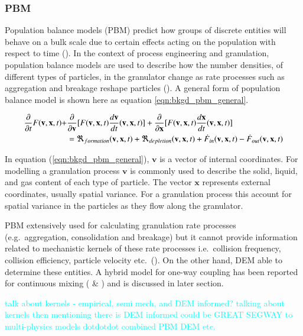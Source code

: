 \documentclass[preprint,11pt,authoryear]{elsarticle}
\begin{document}
	    \subsubsection{PBM}
	    \par Population balance models (PBM) predict how groups of discrete entities will behave on a bulk scale due to certain effects acting on the population with respect to time (\cite{ramkrishna2014}). In the context of process engineering and granulation, population balance models are used to describe how the number densities, of different types of particles, in the granulator change as rate processes such as aggregation and breakage reshape particles (\cite{Barrasso2013}). A general form of population balance model is shown here as equation \ref{eqn:bkgd_pbm_general}.
	    
	    \begin{align}
	    \frac{ \partial}{\partial t}F(\textbf{v},\textbf{x},t) +& \frac{\partial}{\partial \textbf{v}}[F(\textbf{v},\textbf{x},t)\frac{d\textbf{v}}{dt}(\textbf{v},\textbf{x},t)] + \frac{\partial}{\partial \textbf{x}}[F(\textbf{v},\textbf{x},t)\frac{d\textbf{x}}{dt}(\textbf{v},\textbf{x},t)] \notag\\
	    &= \Re_{formation}(\textbf{v},\textbf{x},t)+\Re_{depletion}(\textbf{v},\textbf{x},t)+\dot{F}_{in}(\textbf{v},\textbf{x},t)-\dot{F}_{out}(\textbf{v},\textbf{x},t)
	    \label{eqn:bkgd_pbm_general} 
	    \end{align}
	    
    \par In equation (\ref{eqn:bkgd_pbm_general}), $\textbf{v}$ is a vector of internal coordinates. For modelling a granulation process $\textbf{v}$ is commonly used to describe the solid, liquid, and gas content of each type of particle. The vector $\textbf{x}$ represents external coordinates, usually spatial variance. For a granulation process this  account for spatial variance in the particles as they flow along the granulator.
    \par PBM extensively used for calculating granulation rate processes (e.g.~aggregation, consolidation and breakage) but it cannot provide information related to mechanistic kernels of these rate processes i.e.~collision frequency, collision efficiency, particle velocity etc.~(\cite{sen2014}). On the other hand, DEM able to determine these entities. A hybrid model for one-way coupling has been reported for continuous mixing (\cite{sen2013} \& \cite{sen2013b}) and is discussed in later section.
	    \par \textcolor{cyan}{talk about kernels - empirical, semi mech, and DEM informed? talking about kernels then mentioning there is DEM informed could be GREAT SEGWAY to multi-physics models dotdotdot combined PBM DEM etc.}
	    
\end{document}

